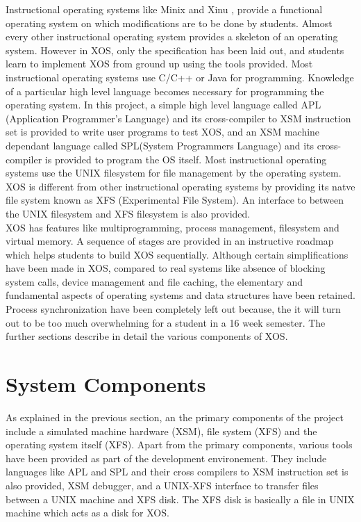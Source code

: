 \documentclass{sig-alternate}
\begin{document}
 
Instructional operating systems like Minix and Xinu \cite{survey}, provide a functional operating system on which modifications are to be done by students. Almost every other instructional operating system provides a skeleton of an operating system. However in XOS, only the specification has been laid out, and students learn to implement XOS from ground up using the tools provided. Most instructional operating systems use C/C++ or Java for programming. Knowledge of a particular high level language becomes necessary for programming the operating system. In this project, a  simple high level language called APL (Application Programmer's Language) and its cross-compiler to XSM instruction set is provided to write user programs to test XOS, and an XSM machine dependant language called SPL(System Programmers Language) and its cross-compiler is provided to program the OS itself. Most instructional operating systems use the UNIX filesystem for file management by the operating system. XOS is different from other instructional operating systems by providing its natve file system known as XFS (Experimental File System). An interface to between the UNIX filesystem and XFS filesystem is also provided.  \\

XOS has features like multiprogramming, process management, filesystem and virtual memory. A sequence of stages are provided in an instructive roadmap which helps students to build XOS sequentially. Although certain simplifications have been made in XOS, compared to real systems like absence of blocking system calls, device management and file caching, the elementary and fundamental aspects of operating systems and data structures have been retained. Process synchronization have been completely left out because, the it will turn out to be too much overwhelming for a student in a 16 week semester. The further sections describe in detail the various components of XOS.


\section{System Components}
As explained in the previous section, an the primary components of the project include a simulated machine hardware (XSM), file system (XFS) and the operating system itself (XFS). Apart from the primary components, various tools have been provided as part of the development environement. They include languages like APL and SPL and their cross compilers to XSM instruction set is also provided, XSM debugger, and a UNIX-XFS interface to transfer files between a UNIX machine and XFS disk. The XFS disk is basically a file in UNIX machine which acts as a disk for XOS. 
\end{document}
